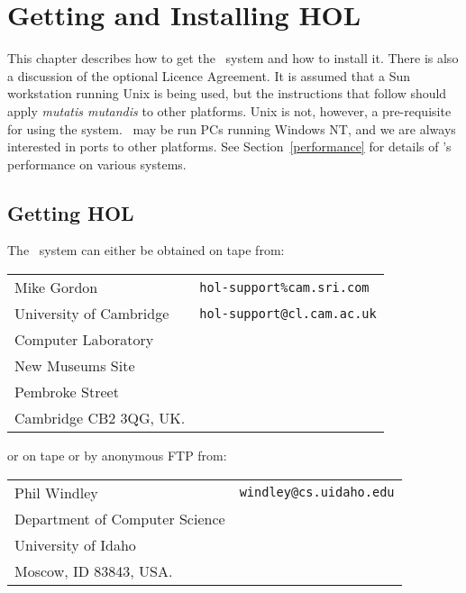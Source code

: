 \chapter{Getting and Installing HOL}
\label{install}

This chapter describes how to get the \HOL\ system and how to install
it.  There is also a discussion of the optional Licence Agreement.  It
is assumed that a Sun workstation running Unix is being used, but the
instructions that follow should apply {\it mutatis mutandis\/} to
other platforms.  Unix is not, however, a pre-requisite for using the
system. \HOL\ may be run PCs running Windows NT, and we are always
interested in ports to other platforms.  See Section~\ref{performance}
for details of \HOL's performance on various systems.

\section{Getting HOL}

The \HOL\ system can either be obtained on tape from:

\vspace*{6pt plus1pt minus1pt}

\begin{tabular}{@{\qquad}l@{\qquad}l}
Mike Gordon & \verb|hol-support%cam.sri.com|\\
University of Cambridge & \verb|hol-support@cl.cam.ac.uk|\\
Computer Laboratory & \mbox{} \\
New Museums Site & \mbox{} \\
Pembroke Street & \mbox {} \\
Cambridge CB2 3QG, UK. & \mbox {}\\
\end{tabular}

\vspace*{6pt plus1pt minus1pt}

\noindent or on tape or by anonymous FTP from:

\vspace*{6pt plus1pt minus1pt}

\begin{tabular}{@{\qquad}l@{\qquad}l}
Phil Windley & \verb|windley@cs.uidaho.edu|\\
Department of Computer Science & \mbox{}\\
University of Idaho & \mbox{} \\
Moscow, ID 83843, USA. & \mbox{} \\
\end{tabular}

